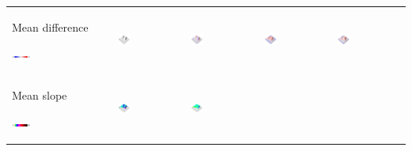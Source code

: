 \documentclass[prodmode,acmtochi]{acmsmall} %
\begin{document}
\begin{table}
{\begin{tabular}{m{} m{} m{} m{} m{}}
%
Mean difference \par \vspace{0.5em} \includegraphics[width=0.19\textwidth]{images/legends/diff_legend_1.pdf} & 
\includegraphics[width=0.19\textwidth]{images/render_3d/dem_difference_1.png} &
\includegraphics[width=0.19\textwidth]{images/render_3d/mean_dem_regression_difference_1.png} &
\includegraphics[width=0.19\textwidth]{images/render_3d/mean_dem_regression_difference_2.png} &
\includegraphics[width=0.19\textwidth]{images/render_3d/mean_dem_regression_difference_3.png}\\
%
Mean slope \par \vspace{0.5em} \includegraphics[width=0.19\textwidth]{images/legends/slope_legend.pdf} & 
\includegraphics[width=0.19\textwidth]{images/render_3d/slope_1.png} &
\includegraphics[width=0.19\textwidth]{images/render_3d/mean_slope_1.png} &

\end{tabular}}
\end{table}
\end{document}
